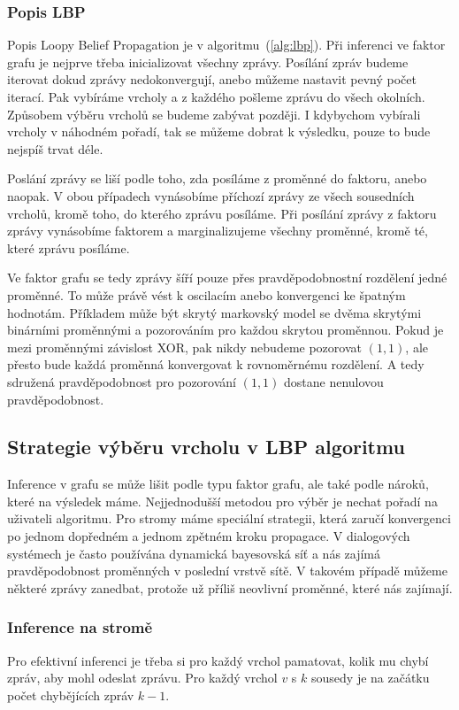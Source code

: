 \subsubsection{Popis LBP}

Popis Loopy Belief Propagation je v algoritmu~(\ref{alg:lbp}).
Při inferenci ve faktor grafu je nejprve třeba inicializovat všechny zprávy.
Posílání zpráv budeme iterovat dokud zprávy nedokonvergují, anebo můžeme nastavit pevný počet iterací.
Pak vybíráme vrcholy a z každého pošleme zprávu do všech okolních.
Způsobem výběru vrcholů se budeme zabývat později.
I kdybychom vybírali vrcholy v náhodném pořadí, tak se můžeme dobrat k výsledku, pouze to bude nejspíš trvat déle.

Poslání zprávy se liší podle toho, zda posíláme z proměnné do faktoru, anebo naopak.
V obou případech vynásobíme příchozí zprávy ze všech sousedních vrcholů, kromě toho, do kterého zprávu posíláme.
Při posílání zprávy z faktoru zprávy vynásobíme faktorem a marginalizujeme všechny proměnné, kromě té, které zprávu posíláme.

Ve faktor grafu se tedy zprávy šíří pouze přes pravděpodobnostní rozdělení jedné proměnné.
To může právě vést k oscilacím anebo konvergenci ke špatným hodnotám. 
Příkladem může být skrytý markovský model se dvěma skrytými binárními proměnnými a pozorováním pro každou skrytou proměnnou.
Pokud je mezi proměnnými závislost XOR, pak nikdy nebudeme pozorovat $(1, 1)$, ale přesto bude každá proměnná konvergovat k rovnoměrnému rozdělení. A tedy sdružená pravděpodobnost pro pozorování $(1, 1)$ dostane nenulovou pravděpodobnost.

\subsection{Strategie výběru vrcholu v LBP algoritmu}

Inference v grafu se může lišit podle typu faktor grafu, ale také podle nároků, které na výsledek máme.
Nejjednodušší metodou pro výběr je nechat pořadí na uživateli algoritmu.
Pro stromy máme speciální strategii, která zaručí konvergenci po jednom dopředném a jednom zpětném kroku propagace.
V dialogových systémech je často používána dynamická bayesovská síť a nás zajímá pravděpodobnost proměnných v poslední vrstvě sítě.
V takovém případě můžeme některé zprávy zanedbat, protože už příliš neovlivní proměnné, které nás zajímají.

\subsubsection{Inference na stromě}

Pro efektivní inferenci je třeba si pro každý vrchol pamatovat, kolik mu chybí zpráv, aby mohl odeslat zprávu.
Pro každý vrchol $v$ s $k$ sousedy je na začátku počet chybějících zpráv $k-1$.
